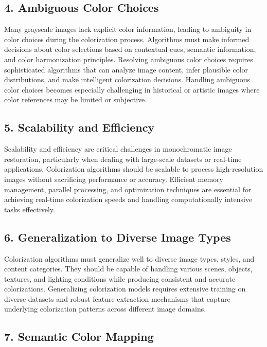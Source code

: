 \subsection*{4. Ambiguous Color Choices}

Many grayscale images lack explicit color information, leading to ambiguity in color choices during the colorization process. Algorithms must make informed decisions about color selections based on contextual cues, semantic information, and color harmonization principles. Resolving ambiguous color choices requires sophisticated algorithms that can analyze image content, infer plausible color distributions, and make intelligent colorization decisions. Handling ambiguous color choices becomes especially challenging in historical or artistic images where color references may be limited or subjective.

\subsection*{5. Scalability and Efficiency}

Scalability and efficiency are critical challenges in monochromatic image restoration, particularly when dealing with large-scale datasets or real-time applications. Colorization algorithms should be scalable to process high-resolution images without sacrificing performance or accuracy. Efficient memory management, parallel processing, and optimization techniques are essential for achieving real-time colorization speeds and handling computationally intensive tasks effectively.

\subsection*{6. Generalization to Diverse Image Types}

Colorization algorithms must generalize well to diverse image types, styles, and content categories. They should be capable of handling various scenes, objects, textures, and lighting conditions while producing consistent and accurate colorizations. Generalizing colorization models requires extensive training on diverse datasets and robust feature extraction mechanisms that capture underlying colorization patterns across different image domains.

\subsection*{7. Semantic Color Mapping}

